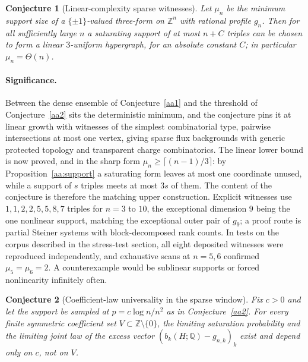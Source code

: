 \documentclass[11pt]{article}
\newtheorem{conjecture}{Conjecture}
\theoremstyle{definition}
\newcommand{\Z}{\mathbb Z}
\providecommand{\Z}{\mathbb Z}
\begin{document}
\begin{conjecture}[Linear-complexity sparse witnesses]\label{aa3}
Let $\mu_n$ be the minimum support size of a $\{\pm1\}$-valued three-form on $\Z^n$ with rational profile $g_n$.  Then for all sufficiently large $n$ a saturating support of at most $n+C$ triples can be chosen to form a linear $3$-uniform hypergraph, for an absolute constant $C$; in particular $\mu_n=\Theta(n)$.
\end{conjecture}

\paragraph{Significance.}
Between the dense ensemble of Conjecture~\ref{aa1} and the threshold of Conjecture~\ref{aa2} sits the deterministic minimum, and the conjecture pins it at linear growth with witnesses of the simplest combinatorial type, pairwise intersections at most one vertex, giving sparse flux backgrounds with generic protected topology and transparent charge combinatorics.  The linear lower bound is now proved, and in the sharp form $\mu_n\ge\lceil(n-1)/3\rceil$: by Proposition~\ref{aa:support} a saturating form leaves at most one coordinate unused, while a support of $s$ triples meets at most $3s$ of them.  The content of the conjecture is therefore the matching upper construction.  Explicit witnesses use $1,1,2,2,5,5,8,7$ triples for $n=3$ to $10$, the exceptional dimension $9$ being the one nonlinear support, matching the exceptional outer pair of $g_9$; a proof route is partial Steiner systems with block-decomposed rank counts.  In tests on the corpus described in the stress-test section, all eight deposited witnesses were reproduced independently, and exhaustive scans at $n=5,6$ confirmed $\mu_5=\mu_6=2$.  A counterexample would be sublinear supports or forced nonlinearity infinitely often.

\begin{conjecture}[Coefficient-law universality in the sparse window]\label{aa4}
Fix $c>0$ and let the support be sampled at $p=c\log n/n^2$ as in Conjecture~\ref{aa2}.  For every finite symmetric coefficient set $V\subset\Z\setminus\{0\}$, the limiting saturation probability and the limiting joint law of the excess vector $(b_k(H;\mathbb Q)-g_{n,k})_k$ exist and depend only on $c$, not on $V$.
\end{conjecture}
\end{document}
